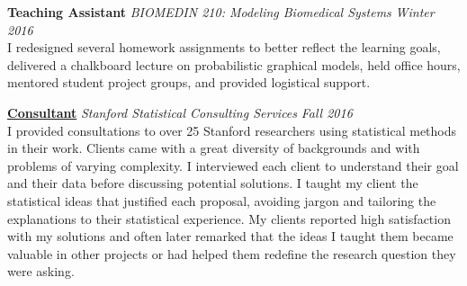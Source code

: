      \textbf{Teaching Assistant} 
     \textsl{BIOMEDIN 210: Modeling Biomedical Systems} 
     \hfill \textsl{Winter 2016} \\ 
    {\small I redesigned several homework assignments to better reflect the learning goals, delivered a chalkboard lecture on probabilistic graphical models, held office hours, mentored student project groups, and provided logistical support.}
    
    \href{https://statistics.stanford.edu/resources/consulting}
    {\textbf{Consultant}}
    \textsl{Stanford Statistical Consulting Services} 
    \hfill \textsl{Fall 2016} \\ 
    {\small I provided consultations to over 25 Stanford researchers using statistical methods in their work. Clients came with a great diversity of backgrounds and with problems of varying complexity. I interviewed each client to understand their goal and their data before discussing potential solutions. I taught my client the statistical ideas that justified each proposal, avoiding jargon and tailoring the explanations to their statistical experience. My clients reported high satisfaction with my solutions and often later remarked that the ideas I taught them became valuable in other projects or had helped them redefine the research question they were asking.}